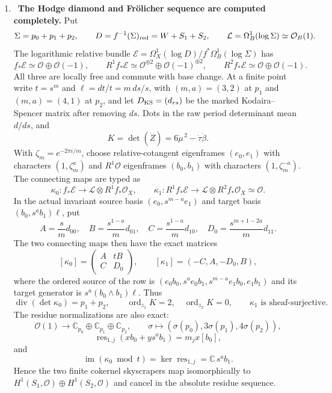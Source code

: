 \begin{enumerate}[leftmargin=1.8em,itemsep=.65em]
\item \Verified\ \textbf{The Hodge diamond and Fr\"olicher sequence are
computed completely.}
Put
\[
 \Sigma=p_0+p_1+p_2,\qquad
 D=f^{-1}(\Sigma)_{\rm red}=W+S_1+S_2,\qquad
 \mathcal L=\Omega_B^1(\log\Sigma)\simeq\mathcal O_B(1).
\]
The logarithmic relative bundle
$\mathcal E=\Omega_X^1(\log D)/f^*\Omega_B^1(\log\Sigma)$ has
\[
f_*\mathcal E\simeq\mathcal O\oplus\mathcal O(-1),\qquad
R^1f_*\mathcal E\simeq\mathcal O^{\oplus2}\oplus\mathcal O(-1)^{\oplus2},
\qquad R^2f_*\mathcal E\simeq\mathcal O\oplus\mathcal O(-1).
\]
All three are locally free and commute with base change.
At a finite point write
$t=s^m$ and $\ell=dt/t=m\,ds/s$, with $(m,a)=(3,2)$ at $p_1$ and
$(m,a)=(4,1)$ at $p_2$, and let
$D_{\rm KS}=(d_{rs})$ be the marked Kodaira--Spencer matrix after removing
$ds$.  Dots in the raw period determinant mean $d/ds$, and
\[
 K=\det(\dot Z)=6\dot\mu^{\,2}-\dot\tau\dot\beta.
\]
With $\zeta_m=e^{-2\pi i/m}$, choose relative-cotangent eigenframes
$(e_0,e_1)$ with characters
$(1,\zeta_m^a)$ and $R^1\mathcal O$ eigenframes $(b_0,b_1)$ with characters
$(1,\zeta_m^{-a})$.  The connecting maps are typed as
\[
 \kappa_0:f_*\mathcal E\longrightarrow
 \mathcal L\otimes R^1f_*\mathcal O_X,\qquad
 \kappa_1:R^1f_*\mathcal E\longrightarrow
 \mathcal L\otimes R^2f_*\mathcal O_X\simeq\mathcal O.
\]
In the actual invariant source basis $(e_0,s^{m-a}e_1)$ and target basis
$(b_0,s^ab_1)\ell$, put
\[
 A=\frac{s}{m}d_{00},\quad B=\frac{s^{1-a}}m d_{01},\quad
 C=\frac{s^{1-a}}m d_{10},\quad
 D_0=\frac{s^{m+1-2a}}m d_{11}.
\]
The two connecting maps then have the exact matrices
\[
 [\kappa_0]=\begin{pmatrix}A&tB\\ C&D_0\end{pmatrix},
 \qquad
 [\kappa_1]=(-C,A,-D_0,B),
\]
where the ordered source of the row is
$(e_0b_0,s^ae_0b_1,s^{m-a}e_1b_0,e_1b_1)$ and its target generator is
$s^a(b_0\wedge b_1)\ell$.  Thus
\[
 \operatorname{div}(\det\kappa_0)=p_1+p_2,\qquad
 \operatorname{ord}_{z_1}K=2,\quad \operatorname{ord}_{z_2}K=0,\qquad
 \kappa_1\text{ is sheaf-surjective}.
\]
The residue normalizations are also exact:
\[
 \mathcal O(1)\longrightarrow
 \mathbb C_{p_0}\oplus\mathbb C_{p_1}\oplus\mathbb C_{p_2},
 \qquad
 \sigma\longmapsto(\sigma(p_0),3\sigma(p_1),4\sigma(p_2)),
\]
\[
 \operatorname{res}_{1,j}(xb_0+ys^ab_1)=m_jx[b_0],
\]
and
\[
 \operatorname{im}(\kappa_0\bmod t)
 =\ker\operatorname{res}_{1,j}=\mathbb C\,s^ab_1.
\]
Hence the two finite cokernel skyscrapers map isomorphically to
$H^1(S_1,\mathcal O)\oplus H^1(S_2,\mathcal O)$ and cancel in the absolute
residue sequence.


\end{enumerate}
